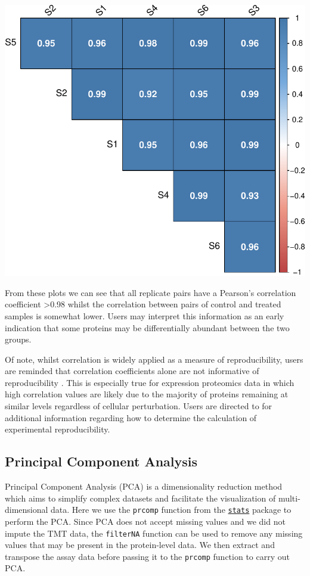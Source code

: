 \documentclass[9pt,a4paper,]{extarticle}
\begin{document}
\begin{center}\includegraphics[height=0.3\textheight]{workflow_expressions_files/figure-latex/correlation_plot_3-1} \end{center}

From these plots we can see that all replicate pairs have a Pearson's correlation
coefficient \textgreater0.98 whilst the correlation between pairs of control and treated
samples is somewhat lower. Users may interpret this information as an early
indication that some proteins may be differentially abundant between the two
groups.

Of note, whilst correlation is widely applied as a measure of reproducibility,
users are reminded that correlation coefficients alone are not informative of
reproducibility \citep{simply_stats, Bunting2019}. This is especially true for
expression proteomics data in which high correlation values are likely due to
the majority of proteins remaining at similar levels regardless of cellular
perturbation. Users are directed to \citep{Darbani2014} for additional information
regarding how to determine the calculation of experimental reproducibility.

\subsection{Principal Component Analysis}\label{principal-component-analysis}

Principal Component Analysis (PCA) is a dimensionality reduction method which
aims to simplify complex datasets and facilitate the visualization of
multi-dimensional data. Here we use the \texttt{prcomp} function from the
\href{https://stat.ethz.ch/R-manual/R-devel/library/stats/html/00Index.html}{\texttt{stats}}
package to perform the PCA. Since PCA does not accept missing values and we did
not impute the TMT data, the \texttt{filterNA} function can be used to remove any
missing values that may be present in the protein-level data. We then extract
and transpose the assay data before passing it to the \texttt{prcomp} function to carry
out PCA.
\end{document}
